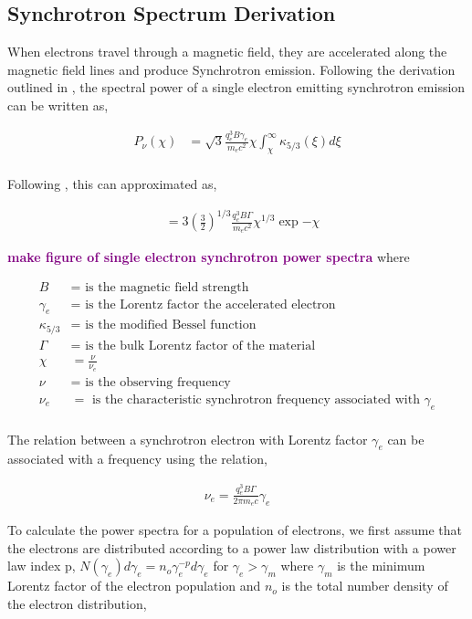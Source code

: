 \documentclass[linenumbers,twocolumn]{aastex631}
\newcommand{\mm}[1]{{\textcolor{purple}{\bf #1}}}
\begin{document}
\begin{appendix}
\section{Synchrotron Spectrum Derivation} \label{app: derive synch}

When electrons travel through a magnetic field, they are accelerated along the magnetic field lines and produce Synchrotron emission. Following the derivation outlined in \citet{1986rpa..book.....R}, the spectral power of a single electron emitting synchrotron emission can be written as,

\begin{align}
	P_{\nu}( \chi ) &= \sqrt{3} \frac{q_e^3 B \gamma_e}{m_e c^2} \chi \int_\chi^\infty \kappa_{5/3}(\xi ) d\xi \\
\end{align}

Following \citet{1973plas.book.....K}, this can approximated as, 

\begin{align}
	& = 3 \left( \frac{3}{2}\right)^{1/3} \frac{q_e^3 B \Gamma}{m_e c^2} \chi^{1/3} \exp{-\chi}
\end{align}

\mm{make figure of single electron synchrotron power spectra}
where 

\begin{align}
	B &= \text{ is the magnetic field strength}\\
	\gamma_e &= \text{ is the Lorentz factor the accelerated electron}\\
	\kappa_{5/3} &= \text{ is the modified Bessel function}\\
	\Gamma &= \text{ is the bulk Lorentz factor of the material}\\
	\chi &= \frac{\nu}{\nu_e}\\
	\nu &= \text{ is the observing frequency}\\
	\nu_e &= \text{ is the characteristic synchrotron frequency associated with $\gamma_e$}\\
\end{align}

The relation between a synchrotron electron with Lorentz factor $\gamma_e$ can be associated with a frequency using the relation, 

\begin{align}
	\nu_e = \frac{q_e^3 B \Gamma}{2\pi m_e c} \gamma_e \label{eq: nu-gamma relation}
\end{align}

To calculate the power spectra for a population of electrons, we first assume that the electrons are distributed according to a power law distribution with a power law index p, $N(\gamma_e) d\gamma_e = n_o \gamma_e^{-p} d\gamma_e$ for $\gamma_e > \gamma_m$ where $\gamma_m$ is the minimum Lorentz factor of the electron population and $n_o$ is the total number density of the electron distribution,


\end{appendix}
\end{document}
